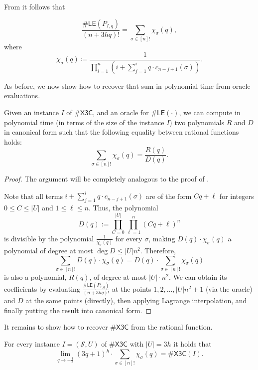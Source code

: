 \documentclass[11pt]{amsart}
\begin{document}
From  it follows that

\[
        \frac{\#\mathsf{LE}(P_{I, q})}{(n+3hq)!} = \sum_{\sigma \in [n]!} \chi_{\sigma}(q),
\]
where
\[
    \chi_{\sigma}(q) \coloneqq \frac{1}{\prod_{i=1}^n  \left(i + \sum_{j=1}^i q \cdot c_{n-j+1}(\sigma)\right)}.
\]


As before, we now show how to recover that sum in polynomial time from oracle evaluations.

\begin{proposition}\label{prop:le_compute-polynomials}
   Given an instance $I$ of $\#\mathsf{X3C}$, and an oracle for $\#\mathsf{LE}(\cdot)$, we can compute in polynomial time (in terms of the size of the instance $I$) two polynomials $R$ and $D$ in canonical form such that the following equality between rational functions holds:
   \[ \sum_{\sigma \in [n]!} \chi_{\sigma}(q) = \frac{R(q)}{D(q)}.
    \]
\end{proposition}

\begin{proof}
The argument will be completely analogous to the proof of .

Note that all terms $i + \sum_{j=1}^i q \cdot c_{n-j+1}(\sigma)$ are of the form $Cq + \ell$ for integers $0 \leq C \leq |U|$ and $1 \leq \ell \leq n$. Thus, 
the polynomial 
\[
    D(q) := \prod_{C = 0}^{|U|} \prod_{\ell=1}^{n} (Cq + \ell)^n
\]
is divisible by the polynomial $\frac{1}{\chi_\sigma(q)}$ for every $\sigma$, making $D(q) \cdot \chi_\sigma(q)$ a polynomial of degree at most $\deg D \leq |U|n^2$. Therefore,
\[
    \sum_{\sigma \in [n]!} D(q)\cdot \chi_\sigma(q) = D(q) \cdot \sum_{\sigma \in [n]!} \chi_\sigma(q)
\] is also a polynomial, $R(q)$, of degree at most $|U| \cdot n^2$.  We can obtain its coefficients by evaluating $\frac{\#\mathsf{LE}(P_{I, q})}{(n+3hq)!}$ at the points $1, 2, \ldots, |U|n^2 + 1$ (via the oracle) and $D$ at the same points (directly), then applying Lagrange interpolation, and finally putting the result into canonical form.
\end{proof}

It remains to show how to recover $\#\mathsf{X3C}$ from the rational function.

\begin{proposition}\label{prop:le_limit}
    For every instance $I = (\mathcal{S}, U)$ of $\#\mathsf{X3C}$ with $|U| = 3h$ it holds that
    \[
        \lim_{q \to -\frac{1}{3}} (3q+1)^h  \cdot \sum_{\sigma \in [n]!} \chi_{\sigma}(q) = \#\mathsf{X3C}(I).
    \]
\end{proposition}
\end{document}
